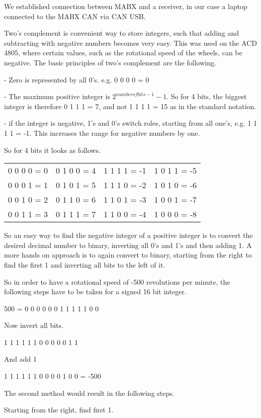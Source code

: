We established connection between MABX and a receiver, in our case a laptop connected to the MABX CAN via CAN USB.


Two's complement is convenient way to store integers, such that adding and subtracting with negative numbers becomes very easy. This was used on the ACD 4805, where certain values, such as the rotational speed of the wheels, can be negative. 
The basic principles of two's complement are the following.

- Zero is represented by all 0's. 
e.g. 0 0 0 0 = 0

- The maximum positive integer is $ 2^{number of bits-1}-1 $.
So for 4 bits, the biggest integer is therefore 0 1 1 1 = 7, and not 1 1 1 1 = 15 as in the standard notation.

- if the integer is negative, 1's and 0's switch roles, starting from all one's, e.g. 1 1 1 1 = -1. This increases the range for negative numbers by one.

So for 4 bits it looks as follows.

\begin{tabular}{llll}
0 0 0 0 = 0 & 0 1 0 0 = 4 & 1 1 1 1 = -1 & 1 0 1 1 = -5\\
0 0 0 1 = 1 & 0 1 0 1 = 5 & 1 1 1 0 = -2 & 1 0 1 0 = -6\\
0 0 1 0 = 2 & 0 1 1 0 = 6 & 1 1 0 1 = -3 & 1 0 0 1 = -7\\
0 0 1 1 = 3 & 0 1 1 1 = 7 & 1 1 0 0 = -4 & 1 0 0 0 = -8
\end{tabular}

So an easy way to find the negative integer of a positive integer is to convert the desired decimal number to binary, inverting all 0's and 1's and then adding 1. A more hands on approach is to again convert to binary, starting from the right to find the first 1 and inverting all bits to the left of it.

So in order to have a rotational speed of -500 revolutions per minute, the following steps have to be taken for a signed 16 bit integer.

500 = 0 0 0 0  0 0 1  1 1 1  1 0 0

Now invert all bits.

1 1 1 1  1 1 0  0 0 0  0 1 1

And add 1

1 1 1 1  1 1 0  0 0 0  1 0 0 = -500

The second method would result in the following steps.

Starting from the right, find first 1.

